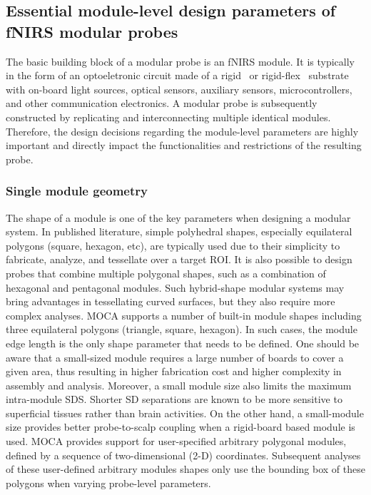 \subsection{Essential module-level design parameters of fNIRS modular probes}
The basic building block of a modular probe is an fNIRS module. It is typically in the form of an optoeletronic circuit made of a rigid~\cite{Chitnis2016, Bci2017, Zhao2019, Wyser2017} or rigid-flex~\cite{Muehlemann2008, Hallacoglu2016} substrate with on-board light sources, optical sensors, auxiliary sensors, microcontrollers, and other communication electronics. A modular probe is subsequently constructed by replicating and interconnecting multiple identical modules. Therefore, the design decisions regarding the module-level parameters are highly important and directly impact the functionalities and restrictions of the resulting probe.

\subsubsection{Single module geometry}
The shape of a module is one of the key parameters when designing a modular system. In published literature, simple polyhedral shapes, especially equilateral polygons (square, hexagon, etc), are typically used due to their simplicity to fabricate, analyze, and tessellate over a target ROI. It is also possible to design probes that combine multiple polygonal shapes, such as a combination of hexagonal and pentagonal modules. Such hybrid-shape modular systems may bring advantages in tessellating curved surfaces, but they also require more complex analyses. MOCA supports a number of built-in module shapes including three equilateral polygons (triangle, square, hexagon). In such cases, the module edge length is the only shape parameter that needs to be defined. One should be aware that a small-sized module requires a large number of boards to cover a given area, thus resulting in higher fabrication cost and higher complexity in assembly and analysis. Moreover, a small module size also limits the maximum intra-module SDS. Shorter SD separations are known to be more sensitive to superficial tissues rather than brain activities. On the other hand, a small-module size provides better probe-to-scalp coupling when a rigid-board based module is used. MOCA provides support for user-specified arbitrary polygonal modules, defined by a sequence of two-dimensional (2-D) coordinates. Subsequent analyses of these user-defined arbitrary modules shapes only use the bounding box of these polygons when varying probe-level parameters.

